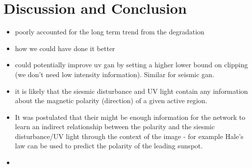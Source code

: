 \documentclass[11pt,a4paper,onecolumn]{report}
\begin{document}
%
%
%
%
%
\chapter{Discussion and Conclusion}
\label{chap:discussion}
%
%
%
%
%

\begin{itemize}
  \item poorly accounted for the long term trend from the degradation
  \item how we could have done it better
  \item could potentially improve uv gan by setting a higher lower bound on
  clipping (we don't need low intensity information). Similar for seismic gan.

  \item it is likely that the siesmic disturbance and UV light contain any
  information about the magnetic polarity (direction) of a given active region.
  \item It was postulated that their might be enough information for the network
  to learn an indirect relationship between the polarity and the siesmic
  disturbance/UV light through the context of the image - for example Hale's law
  can be used to predict the polarity of the leading sunspot.
  \item
\end{itemize}








\end{document}
